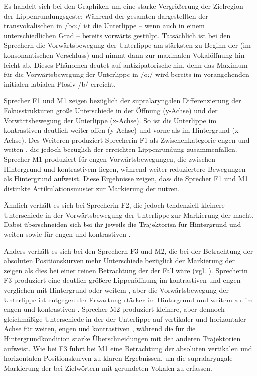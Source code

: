 Es handelt sich bei den Graphiken um eine starke Vergrößerung der Zielregion der Lippenrundungsgeste: Während der gesamten dargestellten  der transvokalischen  in /boː/ ist die Unterlippe -- wenn auch in einem unterschiedlichen Grad -- bereits vorwärts gestülpt. Tatsächlich ist bei den Sprechern die Vorwärtsbewegung der Unterlippe am stärksten zu Beginn der  (im konsonantischen Verschluss) und nimmt dann zur maximalen Vokalöffnung hin leicht ab. Dieses Phänomen deutet auf antizipatorische  hin, denn das Maximum für die Vorwärtsbewegung der Unterlippe in /oː/ wird bereits im vorangehenden initialen labialen Plosiv /b/ erreicht.



Sprecher F1 und M1 zeigen bezüglich der supralaryngalen Differenzierung der Fokusstrukturen große Unterschiede in der Öffnung (y-Achse) und der Vorwärtsbewegung der Unterlippe (x-Achse). So ist die Unterlippe im kontrastiven  deutlich weiter offen (y-Achse) und vorne als im Hintergrund (x-Achse). Des Weiteren produziert Sprecherin F1 als Zwischenkategorie engen und weiten , die jedoch bezüglich der erreichten Lippenrundung zusammenfallen. Sprecher M1 produziert für engen  Vorwärtsbewegungen, die zwischen Hintergrund und kontrastivem  liegen, während weiter  reduziertere Bewegungen als Hintergrund aufweist. Diese Ergebnisse zeigen, dass die Sprecher F1 und M1 distinkte Artikulationsmuster zur Markierung der  nutzen.

Ähnlich verhält es sich bei Sprecherin F2, die jedoch tendenziell kleinere Unterschiede in der Vorwärtsbewegung der Unterlippe zur Markierung der  macht. Dabei überschneiden sich bei ihr jeweils die Trajektorien für Hintergrund und weiten  sowie für engen und kontrastiven . 

Anders verhält es sich bei den Sprechern F3 und M2, die bei der Betrachtung der absoluten Positionskurven mehr Unterschiede bezüglich der Markierung der  zeigen als dies bei einer reinen Betrachtung der  der Fall wäre (vgl. \citealt{Mücke2014b}). Sprecherin F3 produziert eine deutlich größere Lippenöffnung im kontrastiven und engen  verglichen mit Hintergrund oder weitem , aber die Vorwärtsbewegung der Unterlippe ist entgegen der Erwartung stärker im Hintergrund und weitem  als im engen und kontrastiven . Sprecher M2 produziert kleinere, aber dennoch gleichmäßige Unterschiede in der  der Unterlippe auf vertikaler und horizontaler Achse für weiten, engen und kontrastiven , während die  für die Hintergrundkondition starke Überschneidungen mit den anderen Trajektorien aufweist. Wie bei F3 führt bei M1 eine Betrachtung der absoluten vertikalen und horizontalen Positionskurven zu klaren Ergebnissen, um die supralaryngale Markierung der  bei Zielwörtern mit gerundeten Vokalen zu erfassen. 


